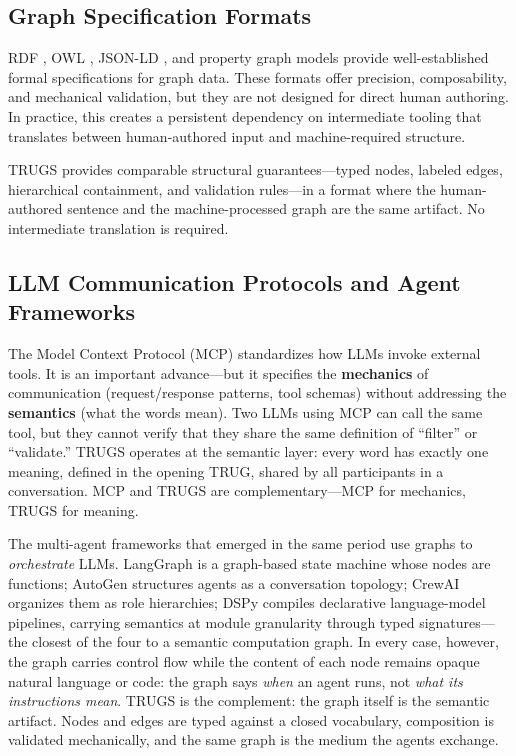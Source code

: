 \documentclass{article}
\begin{document}
\subsection{Graph Specification Formats}

RDF \citep{rdf2014}, OWL \citep{owl2012}, JSON-LD \citep{jsonld2020}, and property graph models \citep{neo4j} provide well-established formal specifications for graph data. These formats offer precision, composability, and mechanical validation, but they are not designed for direct human authoring. In practice, this creates a persistent dependency on intermediate tooling that translates between human-authored input and machine-required structure.

TRUGS provides comparable structural guarantees---typed nodes, labeled edges, hierarchical containment, and validation rules---in a format where the human-authored sentence and the machine-processed graph are the same artifact. No intermediate translation is required.

\subsection{LLM Communication Protocols and Agent Frameworks}

The Model Context Protocol (MCP) \citep{mcp2025} standardizes how LLMs invoke external tools. It is an important advance---but it specifies the \textbf{mechanics} of communication (request/response patterns, tool schemas) without addressing the \textbf{semantics} (what the words mean). Two LLMs using MCP can call the same tool, but they cannot verify that they share the same definition of ``filter'' or ``validate.'' TRUGS operates at the semantic layer: every word has exactly one meaning, defined in the opening TRUG, shared by all participants in a conversation. MCP and TRUGS are complementary---MCP for mechanics, TRUGS for meaning.

The multi-agent frameworks that emerged in the same period use graphs to \emph{orchestrate} LLMs. LangGraph \citep{langgraph2024} is a graph-based state machine whose nodes are functions; AutoGen \citep{wu2023autogen} structures agents as a conversation topology; CrewAI \citep{crewai2023} organizes them as role hierarchies; DSPy \citep{khattab2024dspy} compiles declarative language-model pipelines, carrying semantics at module granularity through typed signatures---the closest of the four to a semantic computation graph. In every case, however, the graph carries control flow while the content of each node remains opaque natural language or code: the graph says \emph{when} an agent runs, not \emph{what its instructions mean}. TRUGS is the complement: the graph itself is the semantic artifact. Nodes and edges are typed against a closed vocabulary, composition is validated mechanically, and the same graph is the medium the agents exchange.
\end{document}
